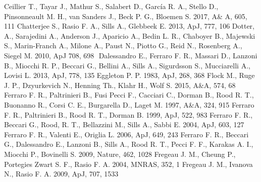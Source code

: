\documentclass[useAMS,usenatbib]{mnras}
\begin{document}
\begin{thebibliography}{99}
 Ceillier T., Tayar J., Mathur S., Salabert D., Garc\'ia R. A., Stello D., Pinsonneault M. H., van Sanders J., Beck P. G., Bloemen S. 2017, A\& A, 605, 111 
 Chatterjee S., Rasio F. A., Sills A., Glebbeek E. 2013, ApJ, 777, 106  
 Dotter, A., Sarajedini A., Anderson J., Aparicio A., Bedin L. R., Chaboyer B., Majewski S., Marin-Franch A., Milone A., Paust N., Piotto G., Reid N., Rosenberg A., Siegel M. 2010, ApJ 708, 698 
 Dalessandro E., Ferraro F. R., Massari D., Lanzoni B., Miocchi R. P., Beccari G., Bellini A., Sills A., Sigurdsson S., Mucciarelli A., Lovisi L. 2013, ApJ, 778, 135
 Eggleton P. P. 1983, ApJ, 268, 368 
 Flock M., Ruge J. P., Dzyurkevich N., Henning Th., Klahr H., Wolf S. 2015, A\&A, 574, 68
  Ferraro F. R., Paltrinieri B., Fusi Pecci F., Cacciari C., Dorman
  B., Rood R. T., Buonanno R., Corsi C. E., Burgarella D., Laget
  M. 1997, A\&A, 324, 915
  Ferraro F. R., Paltrinieri B., Rood R. T., Dorman B. 1999, ApJ, 522,
  983
  Ferraro F. R., Beccari G., Rood, R. T., Bellazzini M., Sills A.,
  Sabbi E. 2004, ApJ, 603, 127
 Ferraro F. R., Valenti E., Origlia L. 2006, ApJ, 649, 243
 Ferraro F. R., Beccari G., Dalessandro E., Lanzoni B., Sills A., Rood R. T., Pecci F. F., Karakas A. I., Miocchi P., Bovinelli S. 2009, Nature, 462, 1028  
 Fregeau J. M., Cheung P.,
  Portegies Zwart S. F., Rasio F. A. 2004, MNRAS, 352, 1
 Fregeau J. M., Ivanova N.,
  Rasio F. A. 2009, ApJ, 707, 1533

\end{thebibliography}
\end{document}
